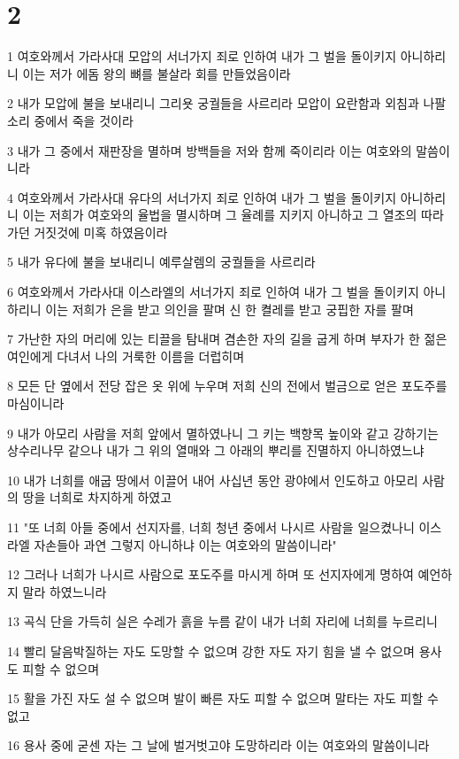 \chapter{2}

\par 1 여호와께서 가라사대 모압의 서너가지 죄로 인하여 내가 그 벌을 돌이키지 아니하리니 이는 저가 에돔 왕의 뼈를 불살라 회를 만들었음이라
\par 2 내가 모압에 불을 보내리니 그리욧 궁궐들을 사르리라 모압이 요란함과 외침과 나팔 소리 중에서 죽을 것이라
\par 3 내가 그 중에서 재판장을 멸하며 방백들을 저와 함께 죽이리라 이는 여호와의 말씀이니라
\par 4 여호와께서 가라사대 유다의 서너가지 죄로 인하여 내가 그 벌을 돌이키지 아니하리니 이는 저희가 여호와의 율법을 멸시하며 그 율례를 지키지 아니하고 그 열조의 따라가던 거짓것에 미혹 하였음이라
\par 5 내가 유다에 불을 보내리니 예루살렘의 궁궐들을 사르리라
\par 6 여호와께서 가라사대 이스라엘의 서너가지 죄로 인하여 내가 그 벌을 돌이키지 아니하리니 이는 저희가 은을 받고 의인을 팔며 신 한 켤레를 받고 궁핍한 자를 팔며
\par 7 가난한 자의 머리에 있는 티끌을 탐내며 겸손한 자의 길을 굽게 하며 부자가 한 젊은 여인에게 다녀서 나의 거룩한 이름을 더럽히며
\par 8 모든 단 옆에서 전당 잡은 옷 위에 누우며 저희 신의 전에서 벌금으로 얻은 포도주를 마심이니라
\par 9 내가 아모리 사람을 저희 앞에서 멸하였나니 그 키는 백향목 높이와 같고 강하기는 상수리나무 같으나 내가 그 위의 열매와 그 아래의 뿌리를 진멸하지 아니하였느냐
\par 10 내가 너희를 애굽 땅에서 이끌어 내어 사십년 동안 광야에서 인도하고 아모리 사람의 땅을 너희로 차지하게 하였고
\par 11 "또 너희 아들 중에서 선지자를, 너희 청년 중에서 나시르 사람을 일으켰나니 이스라엘 자손들아 과연 그렇지 아니하냐 이는 여호와의 말씀이니라"
\par 12 그러나 너희가 나시르 사람으로 포도주를 마시게 하며 또 선지자에게 명하여 예언하지 말라 하였느니라
\par 13 곡식 단을 가득히 실은 수레가 흙을 누름 같이 내가 너희 자리에 너희를 누르리니
\par 14 빨리 달음박질하는 자도 도망할 수 없으며 강한 자도 자기 힘을 낼 수 없으며 용사도 피할 수 없으며
\par 15 활을 가진 자도 설 수 없으며 발이 빠른 자도 피할 수 없으며 말타는 자도 피할 수 없고
\par 16 용사 중에 굳센 자는 그 날에 벌거벗고야 도망하리라 이는 여호와의 말씀이니라

